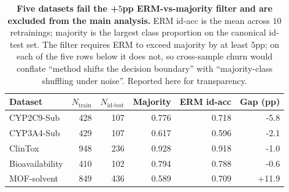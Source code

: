 \begin{table}[h]
  \centering
  \caption{\textbf{\boldmath Five datasets fail the +$5$pp ERM-vs-majority filter and are excluded from the main analysis.}  ERM id-acc is the mean across $10$ retrainings; majority is the largest class proportion on the canonical id-test set.  The filter requires ERM to exceed majority by at least $5$pp; on each of the five rows below it does not, so cross-sample churn would conflate ``method shifts the decision boundary'' with ``majority-class shuffling under noise''.  Reported here for transparency.}
  \label{tab:filter-outcomes}
  \small
  \begin{tabular}{lrrrrr}
    \toprule
    Dataset & $N_{\text{train}}$ & $N_{\text{id-test}}$ & Majority & ERM id-acc & Gap (pp) \\
    \midrule
    CYP2C9-Sub & 428 & 107 & 0.776 & 0.718 & -5.8 \\
    CYP3A4-Sub & 429 & 107 & 0.617 & 0.596 & -2.1 \\
    ClinTox & 948 & 236 & 0.928 & 0.918 & -1.0 \\
    Bioavailability & 410 & 102 & 0.794 & 0.788 & -0.6 \\
    MOF-solvent & 849 & 436 & 0.589 & 0.709 & +11.9 \\
    \bottomrule
  \end{tabular}
\end{table}

